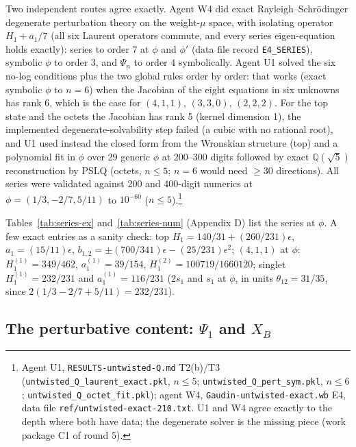 \documentclass[11pt]{article}
\begin{document}
Two independent routes agree exactly.
Agent W4 did exact Rayleigh--Schrödinger degenerate perturbation theory on the weight-$\mu$ space, with isolating operator $H_1+a_1/7$ (all six Laurent operators commute, and every series eigen-equation holds exactly): series to order $7$ at $\phi$ and $\phi'$ (data file record \texttt{E4\_\allowbreak{}SERIES}), symbolic $\phi$ to order $3$, and $\Psi_n$ to order $4$ symbolically.
Agent U1 solved the six no-log conditions plus the two global rules order by order: that works (exact symbolic $\phi$ to $n=6$) when the Jacobian of the eight equations in six unknowns has rank 6, which is the case for $(4,1,1)$, $(3,3,0)$, $(2,2,2)$. For the top state and the octets the Jacobian has rank 5 (kernel dimension 1), the implemented degenerate-solvability step failed (a cubic with no rational root), and U1 used instead the closed form from the Wronskian structure (top) and a polynomial fit in $\phi$ over 29 generic $\phi$ at 200--300 digits followed by exact $\mathbb{Q}(\sqrt5)$ reconstruction by PSLQ (octets, $n\le5$; $n=6$ would need $\ge30$ directions).
All series were validated against 200 and 400-digit numerics at $\phi=(1/3,-2/7,5/11)$ to $10^{-60}$ ($n\le5$).\footnote{Agent U1, \texttt{RESULTS-\allowbreak{}untwisted-\allowbreak{}Q.\allowbreak{}md} T2(b)/T3 (\texttt{untwisted\_\allowbreak{}Q\_\allowbreak{}laurent\_\allowbreak{}exact.\allowbreak{}pkl}, $n\le5$; \texttt{untwisted\_\allowbreak{}Q\_\allowbreak{}pert\_\allowbreak{}sym.\allowbreak{}pkl}, $n\le6$; \texttt{untwisted\_\allowbreak{}Q\_\allowbreak{}octet\_\allowbreak{}fit.\allowbreak{}pkl}); agent W4, \texttt{Gaudin-\allowbreak{}untwisted-\allowbreak{}exact.\allowbreak{}wb} E4, data file \texttt{ref/\allowbreak{}untwisted-\allowbreak{}exact-\allowbreak{}210.\allowbreak{}txt}. U1 and W4 agree exactly to the depth where both have data; the degenerate solver is the missing piece (work package C1 of round 5).}

Tables~\ref{tab:series-ex} and~\ref{tab:series-num} (Appendix D) list the series at $\phi$. A few exact entries as a sanity check: top $H_1=140/31+(260/231)\epsilon$, $a_1=(15/11)\epsilon$, $b_{1,2}=\pm(700/341)\epsilon-(25/231)\epsilon^2$; $(4,1,1)$ at $\phi$: $H_1^{(1)}=349/462$, $a_1^{(1)}=39/154$, $H_1^{(2)}=100719/1660120$; singlet $H_1^{(1)}=232/231$ and $a_1^{(1)}=116/231$ ($2s_1$ and $s_1$ at $\phi$, in units $\theta_{12}=31/35$, since $2(1/3-2/7+5/11)=232/231$).

\subsection{The perturbative content: \texorpdfstring{$\Psi_1$}{} and \texorpdfstring{$X_B$}{XB}}\label{sec:Psi1}
\end{document}
